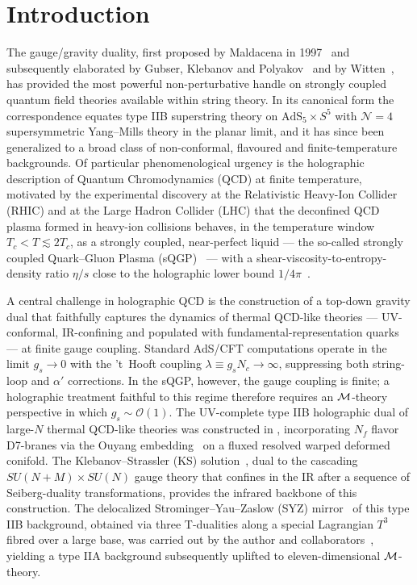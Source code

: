 \documentclass[a4paper,11pt,fleqn]{article}
\theoremstyle{plain}
\theoremstyle{definition}
\begin{document}
\newpage
\tableofcontents





\section{Introduction}

The gauge/gravity duality, first proposed by Maldacena in 1997~\cite{Maldacena:1997re} and
subsequently elaborated by Gubser, Klebanov and Polyakov~\cite{Gubser:1998bc} and by
Witten~\cite{Witten:1998zw}, has provided the most powerful non-perturbative handle on
strongly coupled quantum field theories available within string theory. In its canonical form
the correspondence equates type IIB superstring theory on $\mathrm{AdS}_5\times S^5$ with
$\mathcal{N}=4$ supersymmetric Yang--Mills theory in the planar limit, and it has since been
generalized to a broad class of non-conformal, flavoured and finite-temperature backgrounds.
Of particular phenomenological urgency is the holographic description of Quantum Chromodynamics
(QCD) at finite temperature, motivated by the experimental discovery at the Relativistic
Heavy-Ion Collider (RHIC) and at the Large Hadron Collider (LHC) that the deconfined QCD
plasma formed in heavy-ion collisions behaves, in the temperature window $T_c<T\lesssim 2T_c$,
as a strongly coupled, near-perfect liquid --- the so-called strongly coupled Quark--Gluon
Plasma (sQGP)~\cite{Shuryak:2006se,Muller:2008zz} --- with a shear-viscosity-to-entropy-density
ratio $\eta/s$ close to the holographic lower bound $1/4\pi$~\cite{Kovtun:2004de}.

A central challenge in holographic QCD is the construction of a top-down gravity dual that
faithfully captures the dynamics of thermal QCD-like theories --- UV-conformal, IR-confining
and populated with fundamental-representation quarks --- at finite gauge coupling. Standard
AdS/CFT computations operate in the limit $g_s\to 0$ with the 't~Hooft coupling
$\lambda\equiv g_s N_c\to\infty$, suppressing both string-loop and $\alpha'$ corrections. In
the sQGP, however, the gauge coupling is finite; a holographic treatment faithful to this
regime therefore requires an ${\cal M}$-theory perspective in which $g_s\sim\mathcal{O}(1)$. The UV-complete type IIB holographic dual of large-$N$ thermal QCD-like theories
was constructed in \cite{Mia:2009wj}, incorporating $N_f$ flavor
D7-branes via the Ouyang embedding~\cite{Ouyang} on a fluxed resolved warped deformed conifold.
The Klebanov--Strassler (KS) solution~\cite{Klebanov:2000hb}, dual to the cascading
$SU(N+M)\times SU(N)$ gauge theory that confines in the IR after a sequence of Seiberg-duality
transformations, provides the infrared backbone of this construction. The delocalized
Strominger--Yau--Zaslow (SYZ) mirror~\cite{Strominger:1996it} of this type IIB background, obtained via three T-dualities along a special Lagrangian $T^3$ fibred over a large base, was
carried out by the author and collaborators~\cite{MQGP,OR4}, yielding a type IIA background
subsequently uplifted to eleven-dimensional ${\cal M}$-theory.
\end{document}
